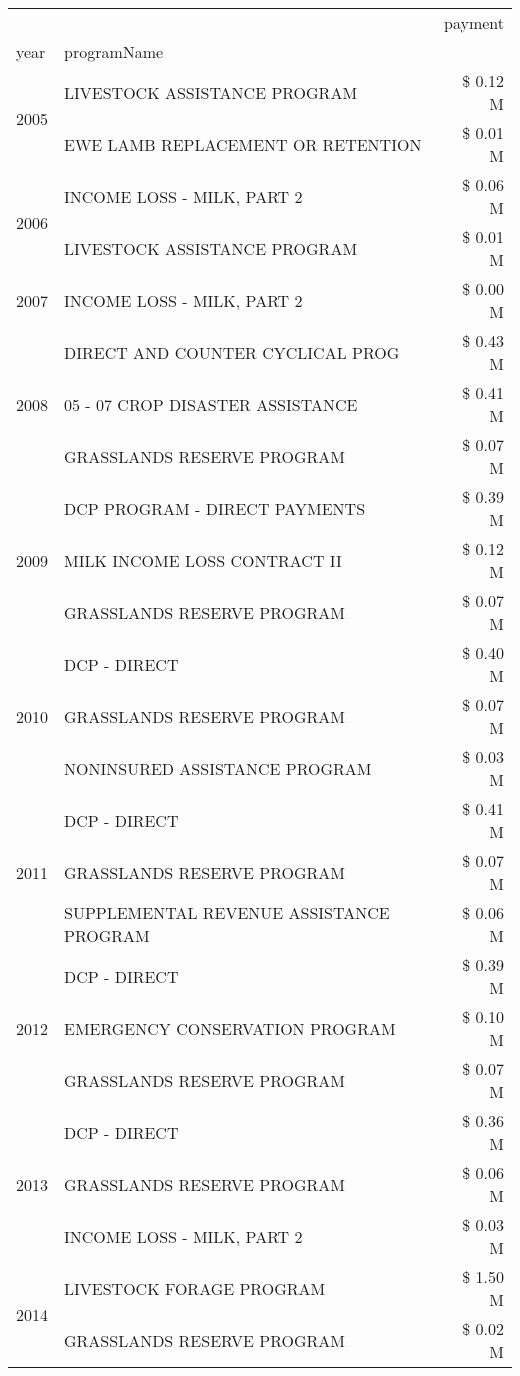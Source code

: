 \begin{tabular}{llr}
\toprule
 &  & payment \\
year & programName &  \\
\midrule
\multirow[t]{2}{*}{2005} & LIVESTOCK ASSISTANCE PROGRAM & \$ 0.12 M \\
 & EWE LAMB REPLACEMENT OR RETENTION & \$ 0.01 M \\
\cline{1-3}
\multirow[t]{2}{*}{2006} & INCOME LOSS - MILK, PART 2 & \$ 0.06 M \\
 & LIVESTOCK ASSISTANCE PROGRAM & \$ 0.01 M \\
\cline{1-3}
2007 & INCOME LOSS - MILK, PART 2 & \$ 0.00 M \\
\cline{1-3}
\multirow[t]{3}{*}{2008} & DIRECT AND COUNTER CYCLICAL PROG & \$ 0.43 M \\
 & 05 - 07 CROP DISASTER ASSISTANCE & \$ 0.41 M \\
 & GRASSLANDS RESERVE PROGRAM & \$ 0.07 M \\
\cline{1-3}
\multirow[t]{3}{*}{2009} & DCP PROGRAM - DIRECT PAYMENTS & \$ 0.39 M \\
 & MILK INCOME LOSS CONTRACT II & \$ 0.12 M \\
 & GRASSLANDS RESERVE PROGRAM & \$ 0.07 M \\
\cline{1-3}
\multirow[t]{3}{*}{2010} & DCP - DIRECT & \$ 0.40 M \\
 & GRASSLANDS RESERVE PROGRAM & \$ 0.07 M \\
 & NONINSURED ASSISTANCE PROGRAM & \$ 0.03 M \\
\cline{1-3}
\multirow[t]{3}{*}{2011} & DCP - DIRECT & \$ 0.41 M \\
 & GRASSLANDS RESERVE PROGRAM & \$ 0.07 M \\
 & SUPPLEMENTAL REVENUE ASSISTANCE PROGRAM & \$ 0.06 M \\
\cline{1-3}
\multirow[t]{3}{*}{2012} & DCP - DIRECT & \$ 0.39 M \\
 & EMERGENCY CONSERVATION PROGRAM & \$ 0.10 M \\
 & GRASSLANDS RESERVE PROGRAM & \$ 0.07 M \\
\cline{1-3}
\multirow[t]{3}{*}{2013} & DCP - DIRECT & \$ 0.36 M \\
 & GRASSLANDS RESERVE PROGRAM & \$ 0.06 M \\
 & INCOME LOSS - MILK, PART 2 & \$ 0.03 M \\
\cline{1-3}
\multirow[t]{3}{*}{2014} & LIVESTOCK FORAGE PROGRAM & \$ 1.50 M \\
 & GRASSLANDS RESERVE PROGRAM & \$ 0.02 M \\

\end{tabular}
